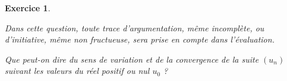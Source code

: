 \documentclass[12pt,a4paper,french]{article}
\theoremstyle{break}
\newtheorem{exercice}{Exercice}
\theoremstyle{nonumberplain}
\theoremstyle{nonumberbreak}
\begin{document}
\begin{exercice}
\begin{enumerate}
      \emph{Dans cette question, toute trace d'argumentation, même
        incomplète, ou d'initiative, même non fructueuse, sera prise en
      compte dans l'évaluation.}

\medskip

      Que peut-on dire du sens de variation et de la convergence de la
      suite $\left(u_{n}\right)$ suivant les valeurs du réel positif ou
      nul $u_{0}$ ?
  \end{enumerate}

  \pagebreak

  \begin{center}
  \end{center}

\end{exercice}
\end{document}
